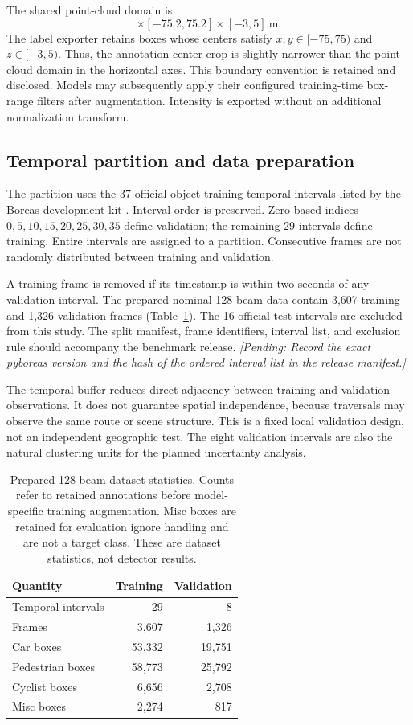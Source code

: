 \documentclass[10pt,twocolumn]{article}
\newcommand{\pending}[1]{\textcolor{blue!55!black}{\textit{[Pending: #1]}}}
\begin{document}
The shared point-cloud domain is
\begin{equation}
[-75.2,75.2]\times[-75.2,75.2]\times[-3,5]\ \mathrm{m}.
\label{eq:domain}
\end{equation}
The label exporter retains boxes whose centers satisfy $x,y\in[-75,75)$ and $z\in[-3,5)$. Thus, the annotation-center crop is slightly narrower than the point-cloud domain in the horizontal axes. This boundary convention is retained and disclosed. Models may subsequently apply their configured training-time box-range filters after augmentation. Intensity is exported without an additional normalization transform.

\subsection{Temporal partition and data preparation}
The partition uses the 37 official object-training temporal intervals listed by the Boreas development kit \cite{pyboreas}. Interval order is preserved. Zero-based indices $0,5,10,15,20,25,30,35$ define validation; the remaining 29 intervals define training. Entire intervals are assigned to a partition. Consecutive frames are not randomly distributed between training and validation.

A training frame is removed if its timestamp is within two seconds of any validation interval. The prepared nominal 128-beam data contain 3,607 training and 1,326 validation frames (Table~\ref{tab:data}). The 16 official test intervals are excluded from this study. The split manifest, frame identifiers, interval list, and exclusion rule should accompany the benchmark release. \pending{Record the exact pyboreas version and the hash of the ordered interval list in the release manifest.}

The temporal buffer reduces direct adjacency between training and validation observations. It does not guarantee spatial independence, because traversals may observe the same route or scene structure. This is a fixed local validation design, not an independent geographic test. The eight validation intervals are also the natural clustering units for the planned uncertainty analysis.

\begin{table}[t]
\centering\small
\caption{Prepared 128-beam dataset statistics. Counts refer to retained annotations before model-specific training augmentation. Misc boxes are retained for evaluation ignore handling and are not a target class. These are dataset statistics, not detector results.}
\label{tab:data}
\begin{tabular}{lrr}
\toprule
Quantity & Training & Validation\\
\midrule
Temporal intervals & 29 & 8\\
Frames & 3,607 & 1,326\\
Car boxes & 53,332 & 19,751\\
Pedestrian boxes & 58,773 & 25,792\\
Cyclist boxes & 6,656 & 2,708\\
Misc boxes & 2,274 & 817\\
\bottomrule
\end{tabular}
\end{table}
\end{document}
